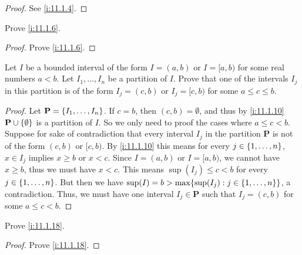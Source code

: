 \begin{proof}
  See \cref{i:11.1.4}.
\end{proof}

\begin{ex}\label{i:ex:11.1.2}
  Prove \cref{i:11.1.6}.
\end{ex}

\begin{proof}
  Prove \cref{i:11.1.6}.
\end{proof}

\begin{ex}\label{i:ex:11.1.3}
  Let \(I\) be a bounded interval of the form \(I = (a, b)\) or \(I = [a, b)\) for some real numbers \(a < b\).
  Let \(I_1, \dots, I_n\) be a partition of \(I\).
  Prove that one of the intervals \(I_j\) in this partition is of the form \(I_j = (c, b)\) or \(I_j = [c, b)\) for some \(a \leq c \leq b\).
\end{ex}

\begin{proof}
  Let \(\mathbf{P} = \left\lbrace I_1, \dots, I_n\right\rbrace\).
  If \(c = b\), then \((c, b) = \emptyset\), and thus by \cref{i:11.1.10} \(\mathbf{P} \cup \left\lbrace\emptyset\right\rbrace\) is a partition of \(I\).
  So we only need to proof the cases where \(a \leq c < b\).
  Suppose for sake of contradiction that every interval \(I_j\) in the partition \(\mathbf{P}\) is not of the form \((c, b)\) or \([c, b)\).
  By \cref{i:11.1.10} this means for every \(j \in \left\lbrace1, \dots, n\right\rbrace\), \(x \in I_j\) implies \(x \geq b\) or \(x < c\).
  Since \(I = (a, b)\) or \(I = [a, b)\), we cannot have \(x \geq b\), thus we must have \(x < c\).
  This means \(\sup(I_j) \leq c < b\) for every \(j \in \left\lbrace1, \dots, n\right\rbrace\).
  But then we have \(\sup(I) = b > \max\set{\sup(I_j) : j \in \set{1, \dots, n}}\), a contradiction.
  Thus, we must have one interval \(I_j \in \mathbf{P}\) such that \(I_j = (c, b)\) for some \(a \leq c < b\).
\end{proof}

\begin{ex}\label{i:ex:11.1.4}
  Prove \cref{i:11.1.18}.
\end{ex}

\begin{proof}
  Prove \cref{i:11.1.18}.
\end{proof}
